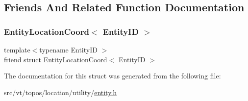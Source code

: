 \subsection{Friends And Related Function Documentation}
\mbox{\label{structvt_1_1location_1_1_loc_entity_abf8115ee4795af8b482a657aa6195a6a}} 
\subsubsection{\texorpdfstring{Entity\+Location\+Coord$<$ Entity\+I\+D $>$}{EntityLocationCoord< EntityID >}}
{\footnotesize\ttfamily template$<$typename Entity\+ID $>$ \\
friend struct \hyperlink{structvt_1_1location_1_1_entity_location_coord}{Entity\+Location\+Coord}$<$ Entity\+ID $>$\hspace{0.3cm}{\ttfamily [friend]}}



The documentation for this struct was generated from the following file\+:\begin{DoxyCompactItemize}
\item 
src/vt/topos/location/utility/\hyperlink{topos_2location_2utility_2entity_8h}{entity.\+h}\end{DoxyCompactItemize}
